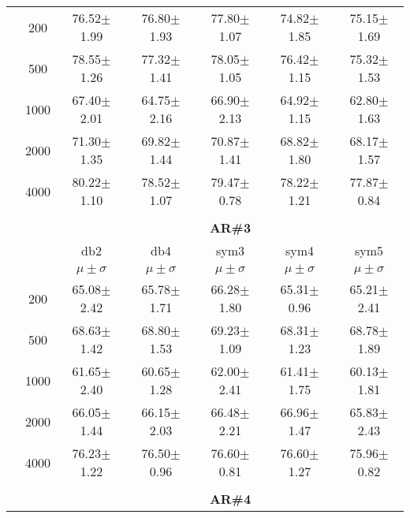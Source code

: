 \begin{table}[H]
\begin{tabular}{|c|c|c c c c c|}
\multicolumn{1}{|c|}{ \multirow{5}{*}{\rotatebox[origin=c]{90}{\textbf{Neurônios}}} }
&200	&76.52$\pm$1.99	&76.80$\pm$1.93	&77.80$\pm$1.07	&74.82$\pm$1.85	&75.15$\pm$1.69\\\cline{2-7}
&500	&78.55$\pm$1.26	&77.32$\pm$1.41	&78.05$\pm$1.05	&76.42$\pm$1.15 &75.32$\pm$1.53\\\cline{2-7}
&1000	&67.40$\pm$2.01	&64.75$\pm$2.16	&66.90$\pm$2.13	&64.92$\pm$1.15	&62.80$\pm$1.63\\\cline{2-7}
&2000	&71.30$\pm$1.35	&69.82$\pm$1.44	&70.87$\pm$1.41	&68.82$\pm$1.80	&68.17$\pm$1.57\\\cline{2-7}
&4000	&80.22$\pm$1.10	&78.52$\pm$1.07	&79.47$\pm$0.78	&78.22$\pm$1.21	&77.87$\pm$0.84


\\ \midrule
\multicolumn{7}{c}{}\\ 



\cline{3-7}
\multicolumn{2}{c|}{\multirow{3}{*}{}} & \multicolumn{5}{c|}{\textbf{AR\#3}}   \\\cline{3-7} 

\multicolumn{2}{c|}{}  & db2 & db4 & sym3 & sym4 & sym5 \\\cline{3-7}
\multicolumn{2}{c|}{}& $\mu \pm \sigma$ & $\mu \pm \sigma$ & $\mu \pm \sigma$ & $\mu \pm \sigma$ & $\mu \pm \sigma$ \\\hline

\multicolumn{1}{|c|}{ \multirow{5}{*}{\rotatebox[origin=c]{90}{\textbf{Neurônios}}} }
&200	&65.08$\pm$2.42	&65.78$\pm$1.71	&66.28$\pm$1.80	&65.31$\pm$0.96	&65.21$\pm$2.41\\\cline{2-7}
&500	&68.63$\pm$1.42 &68.80$\pm$1.53	&69.23$\pm$1.09	&68.31$\pm$1.23	&68.78$\pm$1.89\\\cline{2-7}
&1000	&61.65$\pm$2.40	&60.65$\pm$1.28	&62.00$\pm$2.41	&61.41$\pm$1.75	&60.13$\pm$1.81\\\cline{2-7}
&2000	&66.05$\pm$1.44	&66.15$\pm$2.03	&66.48$\pm$2.21	&66.96$\pm$1.47	&65.83$\pm$2.43\\\cline{2-7}
&4000	&76.23$\pm$1.22	&76.50$\pm$0.96	&76.60$\pm$0.81	&76.60$\pm$1.27	&75.96$\pm$0.82


\\\midrule 
\multicolumn{7}{c}{}\\ 



\cline{3-7}
\multicolumn{2}{c|}{\multirow{3}{*}{}} & \multicolumn{5}{c|}{\textbf{AR\#4}}   \\\cline{3-7} 


\end{tabular}
\end{table}

